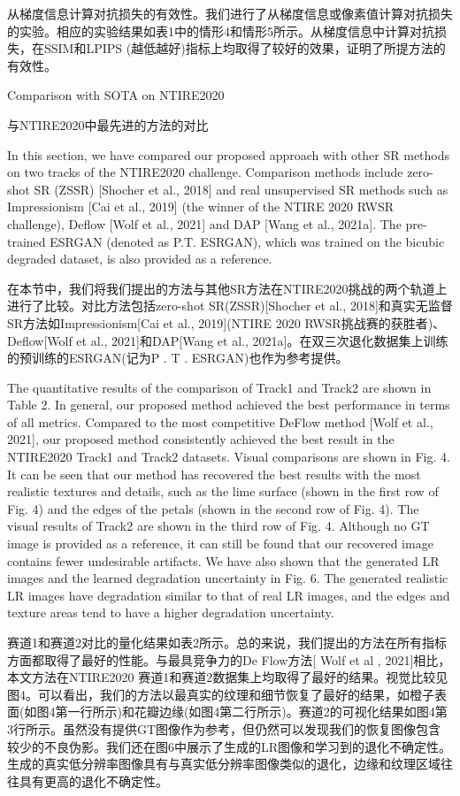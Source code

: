 从梯度信息计算对抗损失的有效性。我们进行了从梯度信息或像素值计算对抗损失的实验。相应的实验结果如表1中的情形4和情形5所示。从梯度信息中计算对抗损失，在SSIM和LPIPS (越低越好)指标上均取得了较好的效果，证明了所提方法的有效性。

Comparison with SOTA on NTIRE2020

与NTIRE2020中最先进的方法的对比

In this section, we have compared our proposed approach with other SR methods on two tracks of the NTIRE2020 challenge. Comparison methods include zero-shot SR (ZSSR) [Shocher et al., 2018] and real unsupervised SR methods such as Impressionism [Cai et al., 2019] (the winner of the NTIRE 2020 RWSR challenge), Deflow [Wolf et al., 2021] and DAP [Wang et al., 2021a]. The pre-trained ESRGAN (denoted as P.T. ESRGAN), which was trained on the bicubic degraded dataset, is also provided as a reference.

在本节中，我们将我们提出的方法与其他SR方法在NTIRE2020挑战的两个轨道上进行了比较。对比方法包括zero-shot SR(ZSSR)[Shocher et al., 2018]和真实无监督SR方法如Impressionism[Cai et al., 2019](NTIRE 2020 RWSR挑战赛的获胜者)、Deflow[Wolf et al., 2021]和DAP[Wang et al., 2021a]。在双三次退化数据集上训练的预训练的ESRGAN(记为P . T . ESRGAN)也作为参考提供。

The quantitative results of the comparison of Track1 and Track2 are shown in Table 2. In general, our proposed method achieved the best performance in terms of all metrics. Compared to the most competitive DeFlow method [Wolf et al., 2021], our proposed method consistently achieved the best result in the NTIRE2020 Track1 and Track2 datasets. Visual comparisons are shown in Fig. 4. It can be seen that our method has recovered the best results with the most realistic textures and details, such as the lime surface (shown in the first row of Fig. 4) and the edges of the petals (shown in the second row of Fig. 4). The visual results of Track2 are shown in the third row of Fig. 4. Although no GT image is provided as a reference, it can still be found that our recovered image contains fewer undesirable artifacts. We have also shown that the generated LR images and the learned degradation uncertainty in Fig. 6. The generated realistic LR images have degradation similar to that of real LR images, and the edges and texture areas tend to have a higher degradation uncertainty.

赛道1和赛道2对比的量化结果如表2所示。总的来说，我们提出的方法在所有指标方面都取得了最好的性能。与最具竞争力的De Flow方法[ Wolf et al , 2021]相比，本文方法在NTIRE2020 赛道1和赛道2数据集上均取得了最好的结果。视觉比较见图4。可以看出，我们的方法以最真实的纹理和细节恢复了最好的结果，如橙子表面(如图4第一行所示)和花瓣边缘(如图4第二行所示)。赛道2的可视化结果如图4第3行所示。虽然没有提供GT图像作为参考，但仍然可以发现我们的恢复图像包含较少的不良伪影。我们还在图6中展示了生成的LR图像和学习到的退化不确定性。生成的真实低分辨率图像具有与真实低分辨率图像类似的退化，边缘和纹理区域往往具有更高的退化不确定性。

